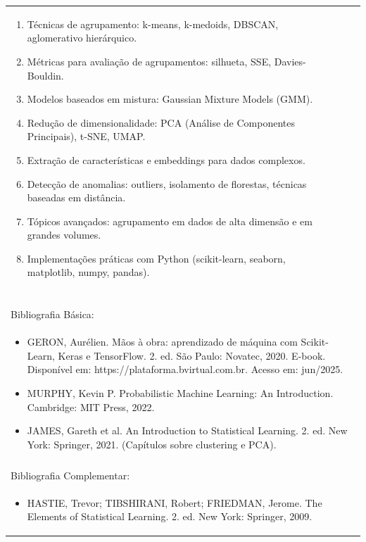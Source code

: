 \documentclass[11pt]{article}
\begin{document}
\begin{center}
\begin{longtable}{|p{4cm}|p{4cm}|p{4cm}|p{4cm}|}
{\begin{enumerate}
\item Técnicas de agrupamento: k-means, k-medoids, DBSCAN, aglomerativo hierárquico.
\item Métricas para avaliação de agrupamentos: silhueta, SSE, Davies-Bouldin.
\item Modelos baseados em mistura: Gaussian Mixture Models (GMM).
\item Redução de dimensionalidade: PCA (Análise de Componentes Principais), t-SNE, UMAP.
\item Extração de características e embeddings para dados complexos.
\item Detecção de anomalias: outliers, isolamento de florestas, técnicas baseadas em distância.
\item Tópicos avançados: agrupamento em dados de alta dimensão e em grandes volumes.
\item Implementações práticas com Python (scikit-learn, seaborn, matplotlib, numpy, pandas).\end{enumerate}}\\
\multicolumn{4}{|p{16cm}|}{}\\
\multicolumn{4}{|p{16cm}|}{}\\
\multicolumn{4}{|p{16cm}|}{\vspace{-1cm}}\\
\multicolumn{4}{|p{16cm}|}{}\\
\hline
\multicolumn{4}{|p{16cm}|}{Bibliografia Básica:}\\
\multicolumn{4}{|p{16cm}|}{%
\begin{itemize}\item GERON, Aurélien. Mãos à obra: aprendizado de máquina com Scikit-Learn, Keras e TensorFlow. 2. ed. São Paulo: Novatec, 2020. E-book. Disponível em: https://plataforma.bvirtual.com.br. Acesso em: jun/2025.
\item MURPHY, Kevin P. Probabilistic Machine Learning: An Introduction. Cambridge: MIT Press, 2022.
\item JAMES, Gareth et al. An Introduction to Statistical Learning. 2. ed. New York: Springer, 2021. (Capítulos sobre clustering e PCA).\end{itemize}}\\
\multicolumn{4}{|p{16cm}|}{}\\
\hline
\multicolumn{4}{|p{16cm}|}{Bibliografia Complementar:}\\
\multicolumn{4}{|p{16cm}|}{%
\begin{itemize}\item HASTIE, Trevor; TIBSHIRANI, Robert; FRIEDMAN, Jerome. The Elements of Statistical Learning. 2. ed. New York: Springer, 2009.

\end{itemize}}
\end{longtable}
\end{center}
\end{document}
